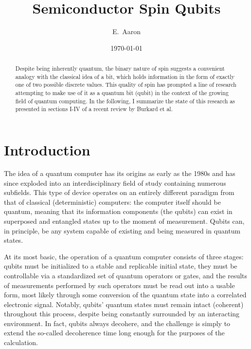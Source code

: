 \documentclass[aps,prl,twocolumn,superscriptaddress,groupedaddress]{revtex4}
\begin{document}
\title{Semiconductor Spin Qubits}
\author{E.~Aaron}

\date{\today}


\begin{abstract}
Despite being inherently quantum, the binary nature of spin suggests a convenient analogy with the classical idea of a bit, which holds information in the form of exactly one of two possible discrete values. This quality of spin has prompted a line of research attempting to make use of it as a quantum bit (qubit) in the context of the growing field of quantum computing. In the following, I summarize the state of this research as presented in sections I-IV of a recent review by Burkard et al.\cite{burkard_semiconductor_2021}
\end{abstract}

\maketitle

\section{Introduction}
The idea of a quantum computer has its origins as early as the 1980s\cite{feynman_simulating_1982} and has since exploded into an interdisciplinary field of study containing numerous subfields. This type of device operates on an entirely different paradigm from that of classical (deterministic) computers: the computer itself should be quantum, meaning that its information components (the qubits) can exist in superposed and entangled states up to the moment of measurement. Qubits can, in principle, be any system capable of existing and being measured in quantum states.

At its most basic, the operation of a quantum computer consists of three stages: qubits must be initialized to a stable and replicable initial state, they must be controllable via a standardized set of quantum operators or gates, and the results of measurements performed by such operators must be read out into a usable form, most likely through some conversion of the quantum state into a correlated electronic signal. Notably, qubits' quantum states must remain intact (coherent) throughout this process, despite being constantly surrounded by an interacting environment. In fact, qubits always decohere, and the challenge is simply to extend the so-called decoherence time long enough for the purposes of the calculation.
\end{document}
